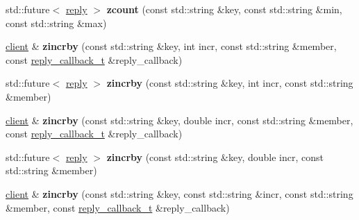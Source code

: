 \begin{DoxyCompactItemize}
\item 
\mbox{\label{classcpp__redis_1_1client_a94416b729f3ecd32d41450725e773590}} 
std\+::future$<$ \hyperlink{classcpp__redis_1_1reply}{reply} $>$ {\bfseries zcount} (const std\+::string \&key, const std\+::string \&min, const std\+::string \&max)
\item 
\mbox{\label{classcpp__redis_1_1client_a7852309fc3054c1bce760e4e2189205b}} 
\hyperlink{classcpp__redis_1_1client}{client} \& {\bfseries zincrby} (const std\+::string \&key, int incr, const std\+::string \&member, const \hyperlink{classcpp__redis_1_1client_a061a1140d36d2eaeda82b09a0bb3f9f2}{reply\+\_\+callback\+\_\+t} \&reply\+\_\+callback)
\item 
\mbox{\label{classcpp__redis_1_1client_ada07e0534d23fd0247cdc1b9a8008fe9}} 
std\+::future$<$ \hyperlink{classcpp__redis_1_1reply}{reply} $>$ {\bfseries zincrby} (const std\+::string \&key, int incr, const std\+::string \&member)
\item 
\mbox{\label{classcpp__redis_1_1client_abeb105281afc762ed57afce5619ef73f}} 
\hyperlink{classcpp__redis_1_1client}{client} \& {\bfseries zincrby} (const std\+::string \&key, double incr, const std\+::string \&member, const \hyperlink{classcpp__redis_1_1client_a061a1140d36d2eaeda82b09a0bb3f9f2}{reply\+\_\+callback\+\_\+t} \&reply\+\_\+callback)
\item 
\mbox{\label{classcpp__redis_1_1client_a59164f47b17261f1a82cef5da072aa4c}} 
std\+::future$<$ \hyperlink{classcpp__redis_1_1reply}{reply} $>$ {\bfseries zincrby} (const std\+::string \&key, double incr, const std\+::string \&member)
\item 
\mbox{\label{classcpp__redis_1_1client_a6f0b61b420ebc8e054c766c6f5034096}} 
\hyperlink{classcpp__redis_1_1client}{client} \& {\bfseries zincrby} (const std\+::string \&key, const std\+::string \&incr, const std\+::string \&member, const \hyperlink{classcpp__redis_1_1client_a061a1140d36d2eaeda82b09a0bb3f9f2}{reply\+\_\+callback\+\_\+t} \&reply\+\_\+callback)
\item 
\mbox{\label{classcpp__redis_1_1client_a202a2adbf6e0d127ad1c5cc301754e5b}} 

\end{DoxyCompactItemize}
